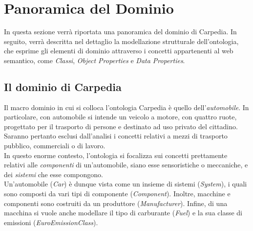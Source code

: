 \chapter{Panoramica del Dominio}
In questa sezione verrà riportata una panoramica del dominio di Carpedia. In seguito, verrà descritta nel dettaglio la modellazione strutturale dell'ontologia, che esprime gli elementi di dominio attraverso i concetti
appartenenti al web semantico, come \textit{Classi}, \textit{Object Properties} e \textit{Data Properties}.

\section{Il dominio di Carpedia}
Il macro dominio in cui si colloca l'ontologia Carpedia è quello dell'\textit{automobile}. In particolare, con automobile si intende un veicolo a motore, con quattro ruote, progettato per il trasporto di persone
e destinato ad uso privato del cittadino. Saranno pertanto esclusi dall'analisi i concetti relativi a mezzi di trasporto pubblico, commerciali o di lavoro.\\

In questo enorme contesto, l'ontologia si focalizza sui concetti prettamente relativi alle \textit{componenti} di un'automobile, siano esse sensoristiche o meccaniche, e dei \textit{sistemi} che
esse compongono.\\

Un'automobile (\textit{Car}) è dunque vista come un insieme di sistemi (\textit{System}), i quali sono composti da vari tipi di componente (\textit{Component}).
Inoltre, macchine e componenti sono costruiti da un produttore (\textit{Manufacturer}). Infine, di una macchina si vuole anche modellare il tipo di carburante (\textit{Fuel}) e la sua classe di emissioni (\textit{EuroEmissionClass}).\\